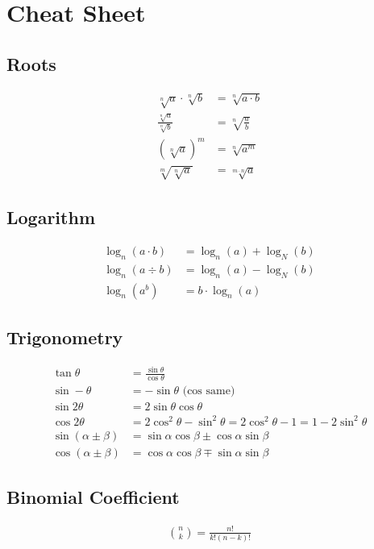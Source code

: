 \section{Cheat Sheet}

\subsection{Roots}

\begin{align*}
    \sqrt[n]{a}\cdot\sqrt[n]{b} & = \sqrt[n]{a\cdot b} \\
    \frac{\sqrt[n]{a}}{\sqrt[n]{b}} & = \sqrt[n]{\frac{a}{b}} \\
    (\sqrt[n]{a})^m & = \sqrt[n]{a^m} \\
    \sqrt[m]{\sqrt[n]{a}} & = \sqrt[m\cdot n]{a}
\end{align*}

\subsection{Logarithm}

\begin{align*}
    \log_n(a\cdot b) & = \log_n(a) + \log_N(b) \\
    \log_n(a\div b) & = \log_n(a) - \log_N(b) \\
    \log_n(a^b) & = b \cdot \log_n(a)
\end{align*}

\subsection{Trigonometry}

\begin{align*}
    \tan\theta & = \frac{\sin\theta}{\cos\theta} \\
    \sin -\theta & = -\sin\theta\text{ (cos same)} \\
    \sin 2\theta & = 2\sin\theta\cos\theta \\
    \cos 2\theta & = 2\cos^2\theta - \sin^2\theta = 2\cos^2\theta - 1 = 1 - 2\sin^2\theta \\
    \sin(\alpha \pm \beta) & = \sin\alpha\cos\beta\pm\cos\alpha\sin\beta \\
    \cos(\alpha\pm\beta) & = \cos\alpha\cos\beta \mp \sin\alpha\sin\beta
\end{align*}

\subsection{Binomial Coefficient}
\begin{align*}
	\binom{n}{k} = \frac{n!}{k!(n-k)!}
\end{align*}

